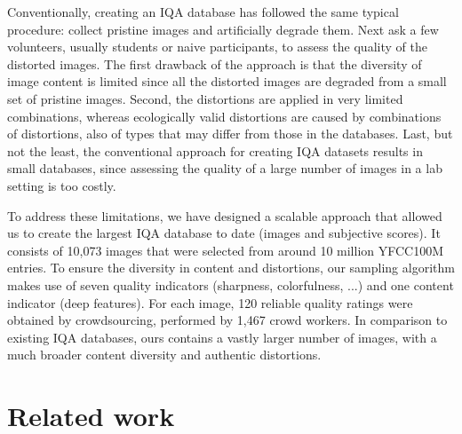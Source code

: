 \documentclass{article}
\begin{document}
Conventionally, creating an IQA database has followed the same typical procedure: collect pristine images and artificially degrade them. Next ask a few volunteers, usually students or naive participants, to assess the quality of the distorted images. The first drawback of the approach is that the diversity of image content is limited since all the distorted images are degraded from a small set of pristine images. Second, the distortions are applied in very limited combinations, whereas ecologically valid distortions are caused by combinations of distortions, also of types that may differ from those in the databases. Last, but not the least, the conventional approach for creating IQA datasets results in small databases, since assessing the quality of a large number of images in a lab setting is too costly.






To address these limitations, we have designed a scalable approach that allowed us to create the largest IQA database to date (images and subjective scores). 
It consists of 10,073 images that were selected from around 10 million YFCC100M \cite{thomee:2016} entries. To ensure the diversity in content and distortions, our sampling algorithm makes use of seven quality indicators (sharpness, colorfulness, ...) and one content indicator (deep features). For each image, 120 reliable quality ratings were obtained by crowdsourcing, performed by 1,467 crowd workers. In comparison to existing IQA databases, ours  contains a vastly larger number of images, with a much broader content diversity and authentic distortions.

















\section{Related work}
\end{document}
